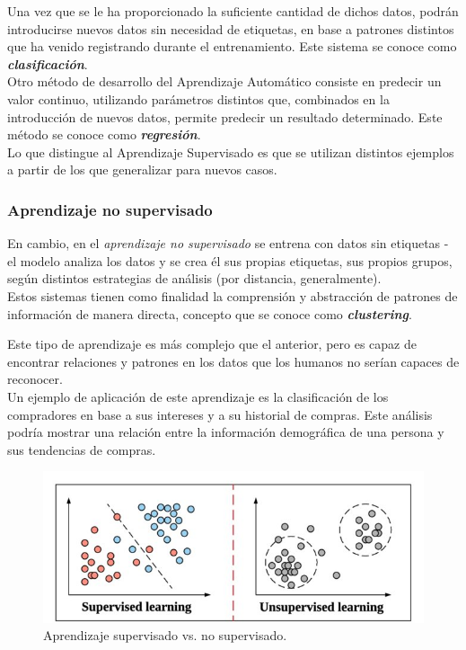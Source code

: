 Una vez que se le ha proporcionado la suficiente cantidad de dichos datos, podrán introducirse nuevos datos sin necesidad de etiquetas, en base a patrones distintos que ha venido registrando durante el entrenamiento. Este sistema se conoce como \textbf{\textit{clasificación}}. \\

Otro método de desarrollo del Aprendizaje Automático consiste en predecir un valor continuo, utilizando parámetros distintos que, combinados en la introducción de nuevos datos, permite predecir un resultado determinado. Este método se conoce como \textbf{\textit{regresión}}. \\

Lo que distingue al Aprendizaje Supervisado es que se utilizan distintos ejemplos a partir de los que generalizar para nuevos casos. 

\subsubsection{Aprendizaje no supervisado}

En cambio, en el \textit{aprendizaje no supervisado} se entrena con datos sin etiquetas - el modelo analiza los datos y se crea él sus propias etiquetas, sus propios grupos, según distintos estrategias de análisis (por distancia, generalmente). \\

Estos sistemas tienen como finalidad la comprensión y abstracción de patrones de información de manera directa, concepto que se conoce como \textbf{\textit{clustering}}.

Este tipo de aprendizaje es más complejo que el anterior, pero es capaz de encontrar relaciones y patrones en los datos que los humanos no serían capaces de reconocer. \\

Un ejemplo de aplicación de este aprendizaje es la clasificación de los compradores en base a sus intereses y a su historial de compras. Este análisis podría mostrar una relación entre la información demográfica de una persona y sus tendencias de compras. \\

\begin{figure}[h]
    \centering
    \includegraphics[scale=1]{cap2_contextualizacion/images/diff_sup_unsu.jpg}
    \caption{Aprendizaje supervisado vs. no supervisado.}
    \label{fig:diff_sup_unsu}
\end{figure}

